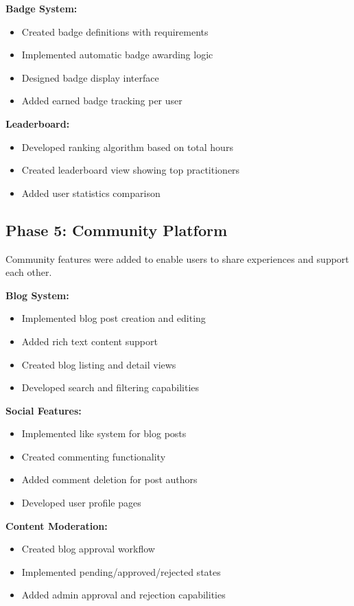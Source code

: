 \documentclass[12pt,a4paper]{report}
\newcommand{\JustifiedNormal}{\fontsize{12}{14}\selectfont\justifying\setlength{\parindent}{0pt}}
\begin{document}
\textbf{Badge System:}
\begin{itemize}
  \item Created badge definitions with requirements
  \item Implemented automatic badge awarding logic
  \item Designed badge display interface
  \item Added earned badge tracking per user
\end{itemize}

\textbf{Leaderboard:}
\begin{itemize}
  \item Developed ranking algorithm based on total hours
  \item Created leaderboard view showing top practitioners
  \item Added user statistics comparison
\end{itemize}

\subsection{Phase 5: Community Platform}
\JustifiedNormal
Community features were added to enable users to share experiences and support each other.

\textbf{Blog System:}
\begin{itemize}
  \item Implemented blog post creation and editing
  \item Added rich text content support
  \item Created blog listing and detail views
  \item Developed search and filtering capabilities
\end{itemize}

\textbf{Social Features:}
\begin{itemize}
  \item Implemented like system for blog posts
  \item Created commenting functionality
  \item Added comment deletion for post authors
  \item Developed user profile pages
\end{itemize}

\textbf{Content Moderation:}
\begin{itemize}
  \item Created blog approval workflow
  \item Implemented pending/approved/rejected states
  \item Added admin approval and rejection capabilities
\end{itemize}
\end{document}
